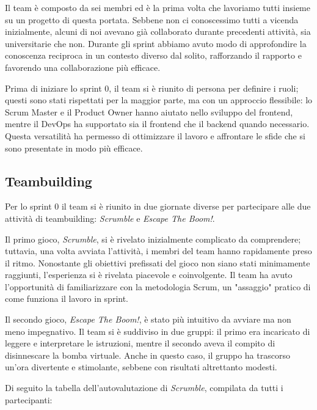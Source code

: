 \documentclass{article}
\begin{document}
Il team è composto da sei membri ed è la prima volta che lavoriamo tutti insieme su un progetto di questa portata. Sebbene non ci 
conoscessimo tutti a vicenda inizialmente, alcuni di noi avevano già collaborato durante precedenti attività, sia universitarie 
che non. Durante gli sprint abbiamo avuto modo di approfondire la conoscenza reciproca in un contesto diverso dal solito, rafforzando 
il rapporto e favorendo una collaborazione più efficace.

Prima di iniziare lo sprint 0, il team si è riunito di persona per definire i ruoli; questi sono stati rispettati per la maggior parte, 
ma con un approccio flessibile: lo Scrum Master e il Product Owner hanno aiutato nello sviluppo del frontend, mentre il DevOps ha supportato 
sia il frontend che il backend quando necessario. Questa versatilità ha permesso di ottimizzare il lavoro e affrontare le sfide che si sono 
presentate in modo più efficace.

\subsection{Teambuilding} \label{sec:teambuilding}

Per lo sprint 0 il team si è riunito in due giornate diverse per partecipare alle due attività di teambuilding: \textit{Scrumble} e 
\textit{Escape The Boom!}.

Il primo gioco, \textit{Scrumble}, si è rivelato inizialmente complicato da comprendere; tuttavia, una volta avviata l'attività, i membri 
del team hanno rapidamente preso il ritmo. Nonostante gli obiettivi prefissati del gioco non siano stati minimamente raggiunti, l'esperienza 
si è rivelata piacevole e coinvolgente. Il team ha avuto l'opportunità di familiarizzare con la metodologia Scrum, un "assaggio" pratico 
di come funziona il lavoro in sprint.

Il secondo gioco, \textit{Escape The Boom!}, è stato più intuitivo da avviare ma non meno impegnativo. Il team si è suddiviso in due gruppi: 
il primo era incaricato di leggere e interpretare le istruzioni, mentre il secondo aveva il compito di disinnescare la bomba virtuale. Anche 
in questo caso, il gruppo ha trascorso un'ora divertente e stimolante, sebbene con risultati altrettanto modesti.

Di seguito la tabella dell'autovalutazione di \textit{Scrumble}, compilata da tutti i partecipanti:
\end{document}

